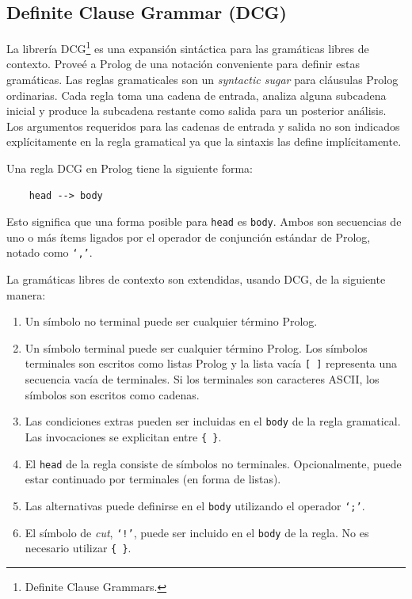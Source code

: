 		
	\subsection{Definite Clause Grammar (DCG)}
	
	La librer\'ia DCG\footnote{Definite Clause Grammars.} es una expansi\'on sint\'actica 
	para las gram\'aticas libres de contexto. Prove\'e a Prolog de
	una notaci\'on conveniente para definir estas gram\'aticas. 
	Las reglas gramaticales son un \emph{syntactic sugar} 
	para cl\'ausulas Prolog ordinarias. Cada regla toma una cadena
	de entrada, analiza alguna subcadena 
	inicial y produce la subcadena restante como salida para un
	posterior an\'alisis. Los argumentos requeridos 
	para las cadenas de entrada y salida no son indicados
	expl\'icitamente en la regla gramatical ya que la sintaxis las define impl\'icitamente.
	
	Una regla DCG en Prolog tiene la siguiente forma:
	
	\begin{verbatim}
	head --> body
	\end{verbatim}
	
	Esto significa que una forma posible para \texttt{head}
        es \texttt{body}. Ambos son secuencias de uno o m\'as \'items 
	ligados por el operador de conjunci\'on est\'andar de Prolog,
        notado como \texttt{`,'}.
	
	La gram\'aticas libres de contexto son extendidas, usando DCG,
	de la siguiente manera:
	
	\begin{enumerate}
	
	\item Un s\'imbolo no terminal puede ser cualquier t\'ermino Prolog.
	
	\item Un s\'imbolo terminal puede ser cualquier t\'ermino
        Prolog. Los s\'imbolos terminales son escritos como 
	listas Prolog y la lista vac\'ia \texttt{[ ]} representa una secuencia vac\'ia de terminales. 
	Si los terminales son caracteres ASCII, los s\'imbolos son escritos como cadenas.
	
	\item Las condiciones extras pueden ser incluidas en el \texttt{body} de la regla gramatical. 
	Las invocaciones se explicitan entre \texttt{\{ \}}.
	
	\item El \texttt{head} de la regla consiste de s\'imbolos no
        terminales. Opcionalmente, puede estar 
	con\-ti\-nua\-do por terminales (en forma de listas).
	
	\item Las alternativas puede definirse en el \texttt{body} 
        utilizando el operador \texttt{`;'}.
	
	\item El s\'imbolo de \emph{cut}, \texttt{`!'}, puede ser 
        incluido en el \texttt{body} de la regla. 
	No es necesario utilizar \texttt{\{ \}}.
	
	\end{enumerate}


